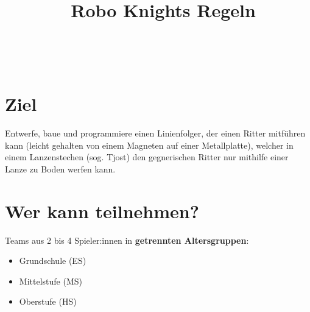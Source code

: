 \documentclass[a4paper,12pt]{article}
\begin{document}



\title{\tagYear\ Robo Knights Regeln}

\makeatletter
\let\inserttitle\@title
\makeatother
\begin{center}
	\rrgerLogo
	\huge                      %
	\bfseries                   %
	\\
	\inserttitle
\end{center}

\section{Ziel}
Entwerfe, baue und programmiere einen Linienfolger, der einen Ritter mitführen
kann (leicht gehalten von einem Magneten auf einer Metallplatte), welcher in
einem Lanzenstechen (sog. Tjost) den gegnerischen Ritter nur mithilfe einer
Lanze zu Boden werfen kann.

\section{Wer kann teilnehmen?}
Teams aus 2 bis 4 Spieler:innen in \textbf{getrennten Altersgruppen}:
\begin{itemize}
	\item Grundschule (ES)
	\item Mittelstufe (MS)
	\item Oberstufe (HS)
\end{itemize}
\combineDivisions
\end{document}
